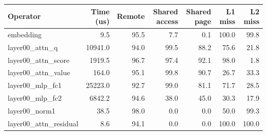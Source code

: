 \begin{tabular}{lrrrrrr}
\toprule
Operator & Time (us) & Remote & Shared access & Shared page & L1 miss & L2 miss \\
\midrule
embedding & 9.5 & 95.5 & 7.7 & 0.1 & 100.0 & 99.8 \\
layer00\_attn\_q & 10941.0 & 94.0 & 99.5 & 88.2 & 75.6 & 21.8 \\
layer00\_attn\_score & 1919.5 & 96.7 & 97.4 & 92.1 & 98.0 & 1.8 \\
layer00\_attn\_value & 164.0 & 95.1 & 99.8 & 90.7 & 26.7 & 33.3 \\
layer00\_mlp\_fc1 & 25223.0 & 92.7 & 99.0 & 81.1 & 71.7 & 28.5 \\
layer00\_mlp\_fc2 & 6842.2 & 94.6 & 38.0 & 45.0 & 30.3 & 17.9 \\
layer00\_norm1 & 38.5 & 98.0 & 0.0 & 0.0 & 50.0 & 99.3 \\
layer00\_attn\_residual & 8.6 & 94.1 & 0.0 & 0.0 & 100.0 & 100.0 \\
\bottomrule
\end{tabular}
